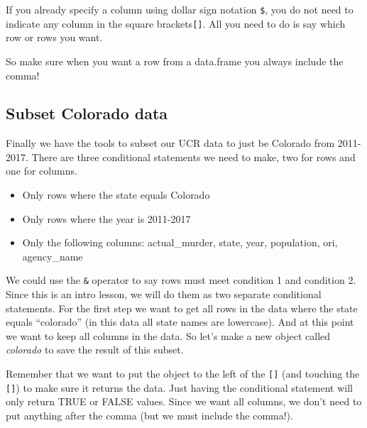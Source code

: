 \documentclass[
]{krantz}
\makeatletter
\newenvironment{Shaded}{\begin{snugshade}}{\end{snugshade}}
\newcommand{\CommentTok}[1]{\textcolor[rgb]{0.37,0.37,0.37}{\textit{#1}}}
\newcommand{\DecValTok}[1]{\textcolor[rgb]{0.06,0.06,0.06}{#1}}
\newcommand{\NormalTok}[1]{#1}
\newcommand{\SpecialCharTok}[1]{\textcolor[rgb]{0,0,0}{#1}}
\providecommand{\tightlist}{%
  \setlength{\itemsep}{0pt}\setlength{\parskip}{0pt}}
\newenvironment{kframe}{%
\medskip{}
\setlength{\fboxsep}{.8em}
 \def\at@end@of@kframe{}%
 \ifinner\ifhmode%
  \def\at@end@of@kframe{\end{minipage}}%
  \begin{minipage}{\columnwidth}%
 \fi\fi%
 \def\FrameCommand##1{\hskip\@totalleftmargin \hskip-\fboxsep
 \colorbox{shadecolor}{##1}\hskip-\fboxsep
     \hskip-\linewidth \hskip-\@totalleftmargin \hskip\columnwidth}%
 \MakeFramed {\advance\hsize-\width
   \@totalleftmargin\z@ \linewidth\hsize
   \@setminipage}}%
 {\par\unskip\endMakeFramed%
 \at@end@of@kframe}
\renewenvironment{Shaded}{\begin{kframe}}{\end{kframe}}
\makeatother
\begin{document}
If you already specify a column using dollar sign notation \texttt{\$}, you do not need to indicate any column in the square brackets\texttt{{[}{]}}. All you need to do is say which row or rows you want.

\begin{Shaded}
\end{Shaded}

So make sure when you want a row from a data.frame you always include the comma!

\hypertarget{subset-colorado-data}{%
\subsection{Subset Colorado data}\label{subset-colorado-data}}

Finally we have the tools to subset our UCR data to just be Colorado from 2011-2017. There are three conditional statements we need to make, two for rows and one for columns.

\begin{itemize}
\tightlist
\item
  Only rows where the state equals Colorado
\item
  Only rows where the year is 2011-2017
\item
  Only the following columns: actual\_murder, state, year, population, ori, agency\_name
\end{itemize}

We could use the \texttt{\&} operator to say rows must meet condition 1 and condition 2. Since this is an intro lesson, we will do them as two separate conditional statements. For the first step we want to get all rows in the data where the state equals ``colorado'' (in this data all state names are lowercase). And at this point we want to keep all columns in the data. So let's make a new object called \emph{colorado} to save the result of this subset.

Remember that we want to put the object to the left of the \texttt{{[}{]}} (and touching the \texttt{{[}{]}}) to make sure it returns the data. Just having the conditional statement will only return TRUE or FALSE values. Since we want all columns, we don't need to put anything after the comma (but we must include the comma!).
\end{document}
